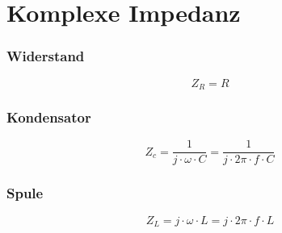 



\section{Komplexe Impedanz}

\subsubsection{Widerstand}
\[ Z_R = R \]

\subsubsection{Kondensator}
\[ Z_c = \frac{1}{j \cdot \omega \cdot C} = \frac{1}{j \cdot 2 \pi \cdot f \cdot C} \]

\subsubsection{Spule}
\[ Z_L = j \cdot \omega \cdot L = j \cdot 2 \pi \cdot f \cdot L \]
